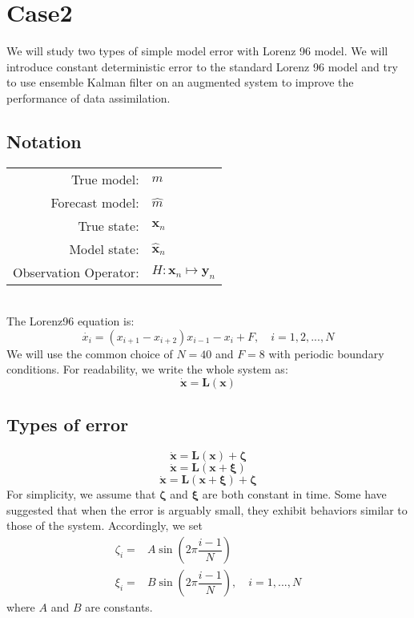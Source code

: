 \documentclass{report}
\begin{document}
\section*{Case2}
We will study two types of simple model error with Lorenz 96 model. We will introduce constant deterministic error to the standard Lorenz 96 model and try to use ensemble Kalman filter on an augmented system to improve the performance of data assimilation.
\subsection*{Notation}
\begin{tabular}{rl}
True model:& $m$\\
Forecast model:& $\hat{m}$\\
True state:& $\pmb{x}_n$\\
Model state:& $\hat{\pmb{x}}_n$\\
Observation Operator:& $H:\pmb{x}_n\mapsto\pmb{y}_n$
\end{tabular}\\
The Lorenz96 equation is:
\begin{equation}
\dot{x_i}=(x_{i+1}-x_{i+2})x_{i-1}-x_{i}+F,\quad i=1,2,...,N
\end{equation}
We will use the common choice of $N=40$ and $F=8$ with periodic boundary conditions. For readability, we write the whole system as:
\begin{equation}
\pmb{\dot{x}}=\mathbf{L(x)}
\end{equation}
\subsection*{Types of error}
\begin{equation}
\dot{\pmb{x}}=\pmb{L}(\pmb{x})+\pmb{\zeta}
\end{equation}
\begin{equation}
\dot{\pmb{x}}=\pmb{L}(\pmb{x}+\pmb{\xi})
\end{equation}
\begin{equation}
\dot{\pmb{x}}=\pmb{L}(\pmb{x}+\pmb{\xi})+\pmb{\zeta}
\end{equation}
For simplicity, we assume that $\pmb{\zeta}$ and $\pmb{\xi}$ are both constant in time. Some have suggested that when the error is arguably small, they exhibit behaviors similar to those of the system. Accordingly, we set
\begin{align}
\zeta_i=&A\sin(2\pi\dfrac{i-1}{N})\\
\xi_i=&B\sin(2\pi\dfrac{i-1}{N}),\quad i=1,...,N
\end{align}
where $A$ and $B$ are constants.
\end{document}
